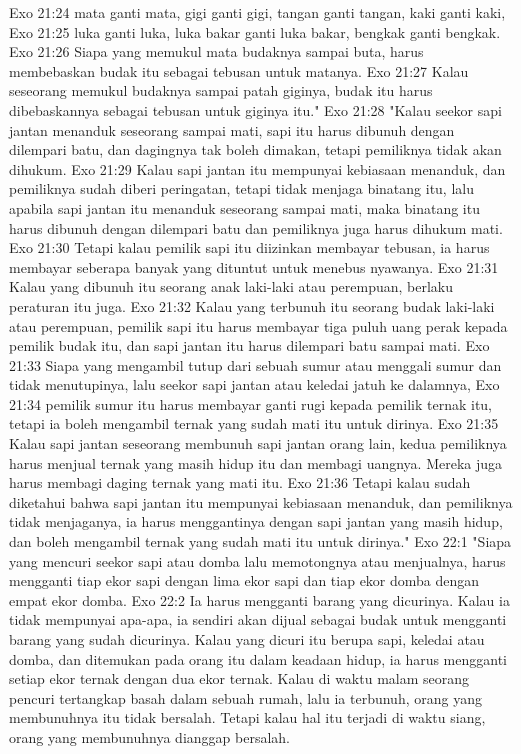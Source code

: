 Exo 21:24  mata ganti mata, gigi ganti gigi, tangan ganti tangan, kaki ganti kaki,
Exo 21:25  luka ganti luka, luka bakar ganti luka bakar, bengkak ganti bengkak.
Exo 21:26  Siapa yang memukul mata budaknya sampai buta, harus membebaskan budak itu sebagai tebusan untuk matanya.
Exo 21:27  Kalau seseorang memukul budaknya sampai patah giginya, budak itu harus dibebaskannya sebagai tebusan untuk giginya itu."
Exo 21:28  "Kalau seekor sapi jantan menanduk seseorang sampai mati, sapi itu harus dibunuh dengan dilempari batu, dan dagingnya tak boleh dimakan, tetapi pemiliknya tidak akan dihukum.
Exo 21:29  Kalau sapi jantan itu mempunyai kebiasaan menanduk, dan pemiliknya sudah diberi peringatan, tetapi tidak menjaga binatang itu, lalu apabila sapi jantan itu menanduk seseorang sampai mati, maka binatang itu harus dibunuh dengan dilempari batu dan pemiliknya juga harus dihukum mati.
Exo 21:30  Tetapi kalau pemilik sapi itu diizinkan membayar tebusan, ia harus membayar seberapa banyak yang dituntut untuk menebus nyawanya.
Exo 21:31  Kalau yang dibunuh itu seorang anak laki-laki atau perempuan, berlaku peraturan itu juga.
Exo 21:32  Kalau yang terbunuh itu seorang budak laki-laki atau perempuan, pemilik sapi itu harus membayar tiga puluh uang perak kepada pemilik budak itu, dan sapi jantan itu harus dilempari batu sampai mati.
Exo 21:33  Siapa yang mengambil tutup dari sebuah sumur atau menggali sumur dan tidak menutupinya, lalu seekor sapi jantan atau keledai jatuh ke dalamnya,
Exo 21:34  pemilik sumur itu harus membayar ganti rugi kepada pemilik ternak itu, tetapi ia boleh mengambil ternak yang sudah mati itu untuk dirinya.
Exo 21:35  Kalau sapi jantan seseorang membunuh sapi jantan orang lain, kedua pemiliknya harus menjual ternak yang masih hidup itu dan membagi uangnya. Mereka juga harus membagi daging ternak yang mati itu.
Exo 21:36  Tetapi kalau sudah diketahui bahwa sapi jantan itu mempunyai kebiasaan menanduk, dan pemiliknya tidak menjaganya, ia harus menggantinya dengan sapi jantan yang masih hidup, dan boleh mengambil ternak yang sudah mati itu untuk dirinya."
Exo 22:1  "Siapa yang mencuri seekor sapi atau domba lalu memotongnya atau menjualnya, harus mengganti tiap ekor sapi dengan lima ekor sapi dan tiap ekor domba dengan empat ekor domba.
Exo 22:2  Ia harus mengganti barang yang dicurinya. Kalau ia tidak mempunyai apa-apa, ia sendiri akan dijual sebagai budak untuk mengganti barang yang sudah dicurinya. Kalau yang dicuri itu berupa sapi, keledai atau domba, dan ditemukan pada orang itu dalam keadaan hidup, ia harus mengganti setiap ekor ternak dengan dua ekor ternak. Kalau di waktu malam seorang pencuri tertangkap basah dalam sebuah rumah, lalu ia terbunuh, orang yang membunuhnya itu tidak bersalah. Tetapi kalau hal itu terjadi di waktu siang, orang yang membunuhnya dianggap bersalah.
